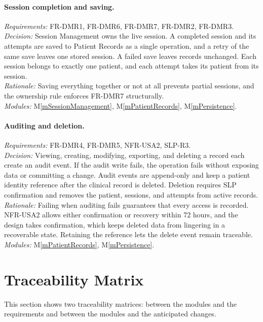\documentclass[12pt, titlepage]{article}
\newcommand{\mref}[1]{M\ref{#1}}
\begin{document}
\paragraph{Session completion and saving.}
\emph{Requirements:} FR-DMR1, FR-DMR6, FR-DMR7, FR-DMR2, FR-DMR3.\\
\emph{Decision:} Session Management owns the live session. A completed session
and its attempts are saved to Patient Records as a single operation, and a
retry of the same save leaves one stored session. A failed save leaves records
unchanged. Each session belongs to exactly one patient, and each attempt takes
its patient from its session.\\
\emph{Rationale:} Saving everything together or not at all prevents partial
sessions, and the ownership rule enforces FR-DMR7 structurally.\\
\emph{Modules:} \mref{mSessionManagement}, \mref{mPatientRecords},
\mref{mPersistence}.

\paragraph{Auditing and deletion.}
\emph{Requirements:} FR-DMR4, FR-DMR5, NFR-USA2, SLP-R3.\\
\emph{Decision:} Viewing, creating, modifying, exporting, and deleting a record
each create an audit event. If the audit write fails, the operation fails
without exposing data or committing a change. Audit events are append-only and
keep a patient identity reference after the clinical record is deleted.
Deletion requires SLP confirmation and removes the patient, sessions, and
attempts from active records.\\
\emph{Rationale:} Failing when auditing fails guarantees that every access is
recorded. NFR-USA2 allows either confirmation or recovery within 72 hours, and
the design takes confirmation, which keeps deleted data from lingering in a
recoverable state. Retaining the reference lets the delete event remain
traceable.\\
\emph{Modules:} \mref{mPatientRecords}, \mref{mPersistence}.

\section{Traceability Matrix} \label{SecTM}

This section shows two traceability matrices: between the modules and the
requirements and between the modules and the anticipated changes.
\end{document}
